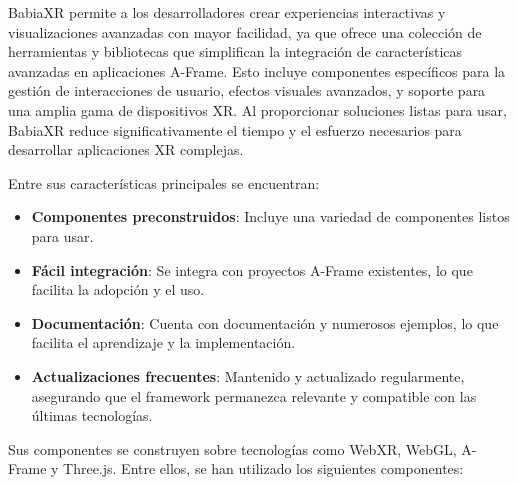 \documentclass[a4paper, 12pt]{book}
\begin{document}
        
        BabiaXR permite a los desarrolladores crear experiencias interactivas y visualizaciones avanzadas con mayor facilidad, ya que ofrece una colección de herramientas y bibliotecas que simplifican la integración de características avanzadas en aplicaciones A-Frame. Esto incluye componentes específicos para la gestión de interacciones de usuario, efectos visuales avanzados, y soporte para una amplia gama de dispositivos XR. Al proporcionar soluciones listas para usar, BabiaXR reduce significativamente el tiempo y el esfuerzo necesarios para desarrollar aplicaciones XR complejas.
        
        Entre sus características principales se encuentran:
        \begin{itemize}
            \item \textbf{Componentes preconstruidos}: Incluye una variedad de componentes listos para usar.
            \item \textbf{Fácil integración}: Se integra con proyectos A-Frame existentes, lo que facilita la adopción y el uso.
            \item \textbf{Documentación}: Cuenta con documentación y numerosos ejemplos, lo que facilita el aprendizaje y la implementación.
            \item \textbf{Actualizaciones frecuentes}: Mantenido y actualizado regularmente, asegurando que el framework permanezca relevante y compatible con las últimas tecnologías.
        \end{itemize}

        Sus componentes se construyen sobre tecnologías como WebXR, WebGL, A-Frame y Three.js. Entre ellos, se han utilizado los siguientes componentes:
\end{document}
